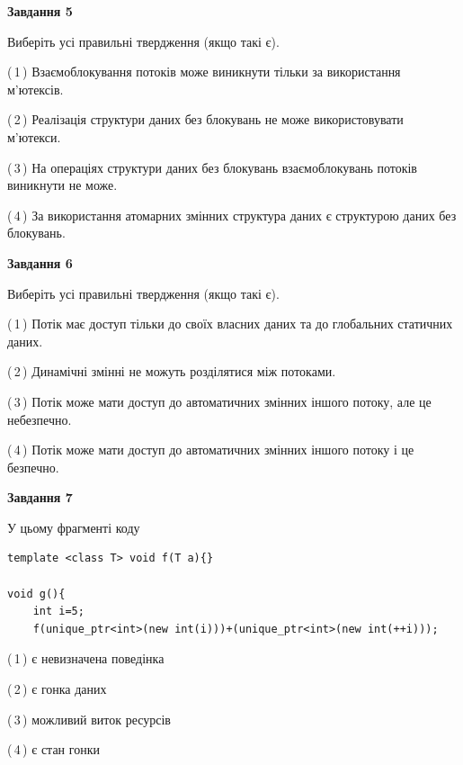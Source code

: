 \documentclass[12pt, ukrainian]{article}
\begin{document}
\begin {large}
{\begin{center}
\textbf{Завдання 5}
\end{center}

Виберіть усі правильні твердження (якщо такі є).\par
\vspace{2mm}

(\,1\,) Взаємоблокування потоків може виникнути тільки за використання м’ютексів.%

(\,2\,) Реалізація структури даних без блокувань не може використовувати м’ютекси.%

(\,3\,) На операціях структури даних без блокувань взаємоблокувань потоків виникнути не може.%

(\,4\,) За використання атомарних змінних структура даних є структурою даних без блокувань.%
\newpage


\begin{center}
\textbf{Завдання 6}
\end{center}

Виберіть усі правильні твердження (якщо такі є).\par
\vspace{2mm}

(\,1\,) Потік має доступ тільки до своїх власних даних та до глобальних статичних даних.%

(\,2\,) Динамічні змінні не можуть розділятися між потоками.%

(\,3\,) Потік може мати доступ до автоматичних змінних іншого потоку, але це небезпечно.%

(\,4\,) Потік може мати доступ до автоматичних змінних іншого потоку і це безпечно.%


\begin{center}
\textbf{Завдання 7}
\end{center}

У цьому фрагменті коду
\begin{verbatim}
template <class T> void f(T a){}

void g(){
    int i=5;
    f(unique_ptr<int>(new int(i)))+(unique_ptr<int>(new int(++i)));
\end{verbatim}
(\,1\,) є невизначена поведінка%

(\,2\,) є гонка даних%

(\,3\,) можливий виток ресурсів%

(\,4\,) є стан гонки%

}
\end {large}

\vspace{4mm}
\newpage
\end{document}
